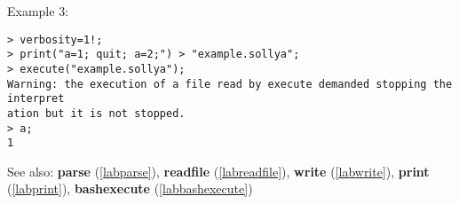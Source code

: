 \noindent Example 3: 
\begin{center}\begin{minipage}{15cm}\begin{Verbatim}[frame=single]
> verbosity=1!;
> print("a=1; quit; a=2;") > "example.sollya";
> execute("example.sollya"); 
Warning: the execution of a file read by execute demanded stopping the interpret
ation but it is not stopped.
> a;
1
\end{Verbatim}
\end{minipage}\end{center}
See also: \textbf{parse} (\ref{labparse}), \textbf{readfile} (\ref{labreadfile}), \textbf{write} (\ref{labwrite}), \textbf{print} (\ref{labprint}), \textbf{bashexecute} (\ref{labbashexecute})
